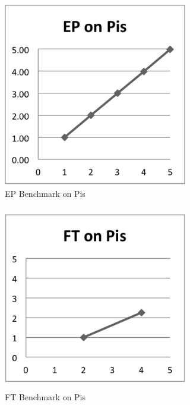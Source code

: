 \documentclass{acm_proc_article-sp}
\begin{document}
\begin{figure}[tbp]
  \centering
  \caption{EP Benchmark on Pis}
	\label{PiEP}
  \includegraphics[width=19pc, height=19pc]{Pics-Pi/EP.png}
\end{figure}

\begin{figure}[tbp]
  \centering
  \caption{FT Benchmark on Pis}
	\label{PiFT}
  \includegraphics[width=19pc, height=19pc]{Pics-Pi/FT.png}
\end{figure}
\end{document}
